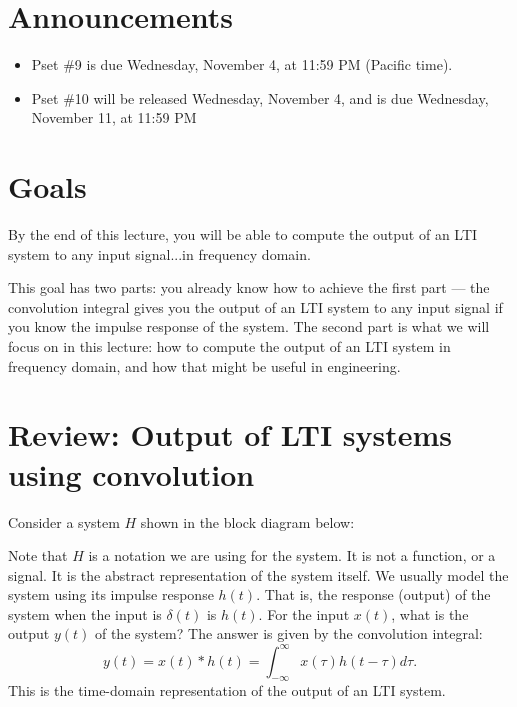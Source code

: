 \section{Announcements}
\begin{itemize}
    \item Pset \#9 is due Wednesday, November 4, at 11:59 PM (Pacific time).
    \item Pset \#10 will be released Wednesday, November 4, and is due Wednesday,
    November 11, at 11:59 PM 
\end{itemize}
\section{Goals}

By the end of this lecture, you will be able to compute the output of an LTI system to any input signal...in frequency domain.

This goal has two parts: you already know how to achieve the first part --- the convolution integral gives you the output of an LTI system to any input signal if you know the impulse response of the system. The second part is what we will focus on in this lecture: how to compute the output of an LTI system in frequency domain, and how that might be useful in engineering.

\section{Review: Output of LTI systems using convolution}
Consider a system $H$ shown in the block diagram below:
\begin{center}
\end{center}
Note that $H$ is a notation we are using for the system. It is not a function, or a signal. It is the abstract representation of the system itself. We usually model the system using its impulse response $h(t)$. That is, the response (output) of the system when the input is $\delta(t)$ is $h(t)$. For the input $x(t)$, what is the output $y(t)$ of the system? The answer is given by the convolution integral:
\[
y(t) = x(t) * h(t) = \int_{-\infty}^{\infty} x(\tau) h(t - \tau) d\tau.
\]
This is the time-domain representation of the output of an LTI system. 
